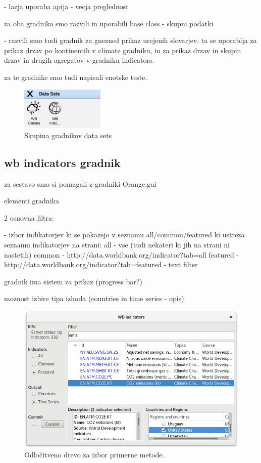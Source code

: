 - lazja uporaba apija
- vecja preglednost


za oba gradniko smo razvili in uporabili base class - skupni podatki

- razvili smo tudi gradnik za gnezned prikaz urejenih slovarjev.
  ta se uporablja za prikaz drzav po kontinentih v climate gradniku,
  in za prikaz drzav in skupin drzav in drugih agregatov v gradniku
  indicators.


za te gradnike smo tudi napisali enotske teste.


\begin{figure}
  \begin{center}
    \includegraphics[width=4cm]{pic/data_sets_group.png}
  \end{center}
  \caption{Skupina gradnikov data sets}
  \label{drevo}
\end{figure} 


\subsection{wb indicators gradnik}

za sestavo smo si pomagali z gradniki Orange.gui 

elementi gradnika

2 osnovna filtra: 

- izbor indikatorjev ki se pokazejo v seznamu all/common/featured 
  ki ustreza seznamu indikatorjev na strani: 
  all - vse (tudi nekateri ki jih na strani ni nastetih)
  common - http://data.worldbank.org/indicator?tab=all
  featured - http://data.worldbank.org/indicator?tab=featured
- text filter

gradnik ima sistem za prikaz (progress bar?) 

moznost izbire tipa izhoda (countries in time series - opis)

\begin{figure}
\begin{center}
\includegraphics[width=12cm]{pic/co2_temp_indicator_selection.png}
\end{center}
\caption{Odločitveno drevo za izbor primerne metode.}
\label{co2_temp_indicator}
\end{figure} 



